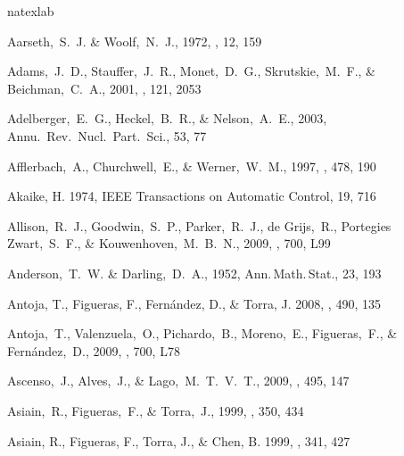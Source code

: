 \begin{thebibliography}{99}

\expandafter\ifx\csname natexlab\endcsname\relax\def\natexlab#1{#1}\fi

  Aarseth,~S.~J. \& Woolf,~N.~J., 1972,
  \aplett, 12, 159

  Adams,~J.~D., Stauffer,~J.~R., Monet,~D.~G., Skrutskie,~M.~F., \& Beichman,~C.~A., 2001,
  \aj, 121, 2053

  Adelberger,~E.~G., Heckel,~B.~R., \& Nelson,~A.~E., 2003,
  Annu.~Rev.~Nucl.~Part.~Sci., 53, 77

  Afflerbach,~A., Churchwell,~E., \& Werner,~W.~M., 1997,
  \apj, 478, 190

{Akaike}, H. 1974, {IEEE Transactions on Automatic Control}, 19, 716

  Allison,~R.~J., Goodwin,~S.~P., Parker,~R.~J., de Grijs,~R., Portegies Zwart,~S.~F., \& Kouwenhoven,~M.~B.~N., 2009,
  \apjl, 700, L99

  Anderson,~T.~W. \& Darling,~D.~A., 1952,
  Ann.\,Math.\,Stat., 23, 193

{Antoja}, T., {Figueras}, F., {Fern{\'a}ndez}, D., \& {Torra}, J. 2008, \aap,
  490, 135

  Antoja,~T., Valenzuela,~O., Pichardo,~B., Moreno,~E., Figueras,~F., \& Fern{\'a}ndez,~D., 2009,
  \apjl, 700, L78

  Ascenso,~J., Alves,~J., \& Lago,~M.~T.~V.~T., 2009,
  \aap, 495, 147

  Asiain,~R., Figueras,~F., \& Torra,~J., 1999,
  \aap, 350, 434

{Asiain}, R., {Figueras}, F., {Torra}, J., \& {Chen}, B. 1999, \aap, 341, 427


\end{thebibliography}
